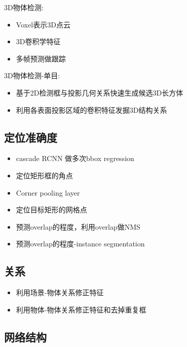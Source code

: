 \documentclass[UTF8, a4paper]{ctexart}
\begin{document}
3D物体检测\cite{fast_furious_Luo_2018_CVPR}:
\begin{itemize}
    \item Voxel表示3D点云
    \item 3D卷积学特征
    \item 多帧预测做跟踪
\end{itemize}

3D物体检测-单目\cite{GS3D_Li_2019_CVPR}:
\begin{itemize}
    \item 基于2D检测框与投影几何关系快速生成候选3D长方体
    \item 利用各表面投影区域的卷积特征发掘3D结构关系
\end{itemize}

\subsection{定位准确度}

\begin{itemize}
    \item cascade RCNN 做多次bbox regression\cite{cascade_rcnn_Cai_2018_CVPR}
    \item 定位矩形框的角点\cite{corner_local_text_Lyu_2018_CVPR,CornerNet_Law_2018_ECCV}
    \item Corner pooling layer\cite{CornerNet_Law_2018_ECCV}
    \item 定位目标矩形的网格点\cite{Grid_rcnn_Lu_2019_CVPR}
    \item 预测overlap的程度，利用overlap做NMS\cite{acqu_local_confidence_Jiang_2018_ECCV}
    \item 预测overlap的程度-instance segmentation\cite{Mask_scoring_rcnn_Huang_2019_CVPR}
\end{itemize}

\subsection{关系}

\begin{itemize}
    \item 利用场景-物体关系修正特征\cite{Structure_inferNet_Liu_2018_CVPR}
    \item 利用物体-物体关系修正特征和去掉重复框\cite{relatNet_objDet_Hu_2018_CVPR,scene_graph_gen_Li_2017_ICCV}
\end{itemize}

\subsection{网络结构}
\end{document}
